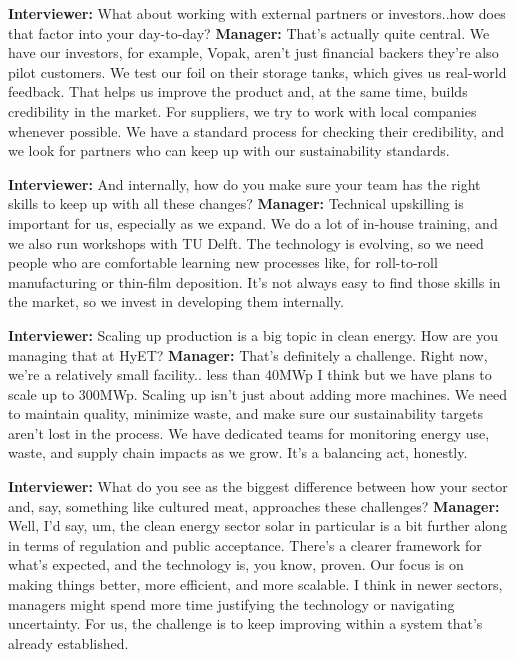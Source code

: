 \textbf{Interviewer:} What about working with external partners or investors..how does that factor into your day-to-day? \newline
\textbf{Manager:} That's actually quite central. We have our investors, for example, Vopak, aren't just financial backers they're also pilot customers. We test our foil on their storage tanks, which gives us real-world feedback. That helps us improve the product and, at the same time, builds credibility in the market. For suppliers, we try to work with local companies whenever possible. We have a standard process for checking their credibility, and we look for partners who can keep up with our sustainability standards. \newline

\textbf{Interviewer:} And internally, how do you make sure your team has the right skills to keep up with all these changes?
\textbf{Manager:} Technical upskilling is important for us, especially as we expand. We do a lot of in-house training, and we also run workshops with TU Delft. The technology is evolving, so we need people who are comfortable learning new processes like, for roll-to-roll manufacturing or thin-film deposition. It's not always easy to find those skills in the market, so we invest in developing them internally. \newline

\textbf{Interviewer:} Scaling up production is a big topic in clean energy. How are you managing that at HyET? \newline
\textbf{Manager:} That's definitely a challenge. Right now, we're a relatively small facility.. less than 40MWp I think but we have plans to scale up to 300MWp. Scaling up isn't just about adding more machines. We need to maintain quality, minimize waste, and make sure our sustainability targets aren't lost in the process. We have dedicated teams for monitoring energy use, waste, and supply chain impacts as we grow. It's a balancing act, honestly. \newline

\textbf{Interviewer:} What do you see as the biggest difference between how your sector and, say, something like cultured meat, approaches these challenges? \newline
\textbf{Manager:} Well, I'd say, um, the clean energy sector solar in particular is a bit further along in terms of regulation and public acceptance. There's a clearer framework for what's expected, and the technology is, you know, proven. Our focus is on making things better, more efficient, and more scalable. I think in newer sectors, managers might spend more time justifying the technology or navigating uncertainty. For us, the challenge is to keep improving within a system that's already established. \newline

